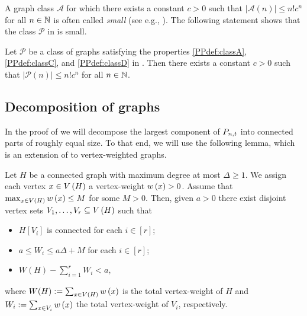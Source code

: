 A graph class $\mathcal{A}$ for which there exists a constant $c>0$ such that $\left|\mathcal{A}(n)\right|\leq n!c^n$ for all $n\in\mathbb{N}$ is often called \textit{small} (see e.g., \cite{NorineSeymourThomasWollan2006}). The following statement shows that the class $\mathcal{P}$ in  is small.
\begin{thm}\label{PPthm:small_classes}
	Let $\mathcal{P}$ be a class of graphs satisfying the properties \ref{PPdef:classA}, \ref{PPdef:classC}, and \ref{PPdef:classD} in . Then there exists a constant $c>0$ such that $\left|\mathcal{P}(n)\right|\leq n!c^n$ for all $n\in\mathbb{N}$. 
\end{thm}

\subsection{Decomposition of graphs}
In the proof of  we will decompose the largest component of $P_{n,t}$ into connected parts of roughly equal size. To that end, we will use the following lemma, which is an extension of \cite[Proposition 4.5]{KrivelevichNachmias2006} to vertex-weighted graphs.
\begin{lem}\label{PPlem:decomposition}
Let $H$ be a connected graph with maximum degree at most $\Delta\geq 1$. We assign each vertex $x\in V\left(H\right)$ a vertex-weight $w\left(x\right)>0$. Assume that $\max_{x\in V\left(H\right)}w\left(x\right)\leq M$ for some $M>0$. Then, given $a>0$ there exist disjoint vertex sets $V_1, \ldots, V_r\subseteq V\left(H\right)$ such that
\begin{itemize}
\item
$H\left[V_i\right]$ is connected for each $i\in[r]$;
\item
$a\leq W_i\leq a \Delta+M$ for each $i\in[r]$;
\item
$W(H)-\sum_{i=1}^{r}W_i<a$,
\end{itemize}
where $W(H):=\sum_{x\in V(H)}w\left(x\right)$ is the total vertex-weight of $H$ and $W_i:=\sum_{x\in V_i}w\left(x\right)$ the total vertex-weight of $V_i$, respectively.
\end{lem}

